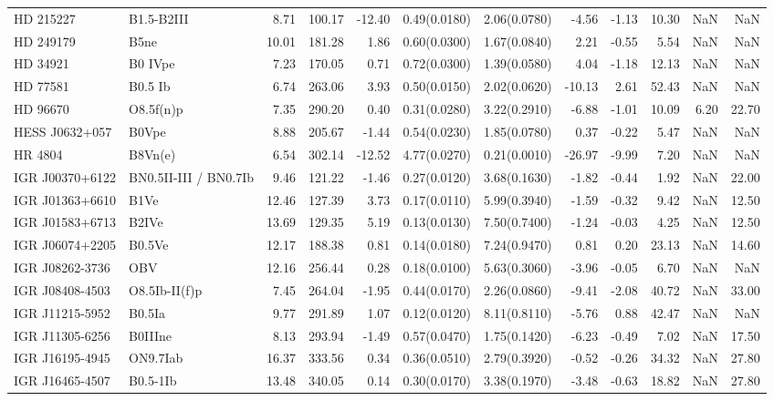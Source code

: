 \begin{longtable}{llrrrllrrrrr}
HD 215227 & B1.5-B2III & 8.71 & 100.17 & -12.40 & 0.49(0.0180) & 2.06(0.0780) & -4.56 & -1.13 & 10.30 & NaN & NaN \\
HD 249179 & B5ne & 10.01 & 181.28 & 1.86 & 0.60(0.0300) & 1.67(0.0840) & 2.21 & -0.55 & 5.54 & NaN & NaN \\
HD 34921 & B0 IVpe & 7.23 & 170.05 & 0.71 & 0.72(0.0300) & 1.39(0.0580) & 4.04 & -1.18 & 12.13 & NaN & NaN \\
HD 77581 & B0.5 Ib & 6.74 & 263.06 & 3.93 & 0.50(0.0150) & 2.02(0.0620) & -10.13 & 2.61 & 52.43 & NaN & NaN \\
HD 96670 & O8.5f(n)p & 7.35 & 290.20 & 0.40 & 0.31(0.0280) & 3.22(0.2910) & -6.88 & -1.01 & 10.09 & 6.20 & 22.70 \\
HESS J0632+057 & B0Vpe & 8.88 & 205.67 & -1.44 & 0.54(0.0230) & 1.85(0.0780) & 0.37 & -0.22 & 5.47 & NaN & NaN \\
HR 4804 & B8Vn(e) & 6.54 & 302.14 & -12.52 & 4.77(0.0270) & 0.21(0.0010) & -26.97 & -9.99 & 7.20 & NaN & NaN \\
IGR J00370+6122 & BN0.5II-III / BN0.7Ib & 9.46 & 121.22 & -1.46 & 0.27(0.0120) & 3.68(0.1630) & -1.82 & -0.44 & 1.92 & NaN & 22.00 \\
IGR J01363+6610 & B1Ve & 12.46 & 127.39 & 3.73 & 0.17(0.0110) & 5.99(0.3940) & -1.59 & -0.32 & 9.42 & NaN & 12.50 \\
IGR J01583+6713 & B2IVe & 13.69 & 129.35 & 5.19 & 0.13(0.0130) & 7.50(0.7400) & -1.24 & -0.03 & 4.25 & NaN & 12.50 \\
IGR J06074+2205 & B0.5Ve & 12.17 & 188.38 & 0.81 & 0.14(0.0180) & 7.24(0.9470) & 0.81 & 0.20 & 23.13 & NaN & 14.60 \\
IGR J08262-3736 & OBV & 12.16 & 256.44 & 0.28 & 0.18(0.0100) & 5.63(0.3060) & -3.96 & -0.05 & 6.70 & NaN & NaN \\
IGR J08408-4503 & O8.5Ib-II(f)p & 7.45 & 264.04 & -1.95 & 0.44(0.0170) & 2.26(0.0860) & -9.41 & -2.08 & 40.72 & NaN & 33.00 \\
IGR J11215-5952 & B0.5Ia & 9.77 & 291.89 & 1.07 & 0.12(0.0120) & 8.11(0.8110) & -5.76 & 0.88 & 42.47 & NaN & NaN \\
IGR J11305-6256 & B0IIIne & 8.13 & 293.94 & -1.49 & 0.57(0.0470) & 1.75(0.1420) & -6.23 & -0.49 & 7.02 & NaN & 17.50 \\
IGR J16195-4945 & ON9.7Iab & 16.37 & 333.56 & 0.34 & 0.36(0.0510) & 2.79(0.3920) & -0.52 & -0.26 & 34.32 & NaN & 27.80 \\
IGR J16465-4507 & B0.5-1Ib & 13.48 & 340.05 & 0.14 & 0.30(0.0170) & 3.38(0.1970) & -3.48 & -0.63 & 18.82 & NaN & 27.80 \\

\end{longtable}
